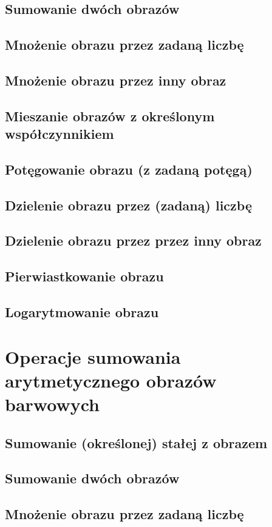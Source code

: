 \documentclass[a4paper,12pt]{book}
\begin{document}
\section{Sumowanie dwóch obrazów}
\section{Mnożenie obrazu przez zadaną liczbę}
\section{Mnożenie obrazu przez inny obraz}
\section{Mieszanie obrazów z określonym współczynnikiem}
\section{Potęgowanie obrazu (z zadaną potęgą)}
\section{Dzielenie obrazu przez (zadaną) liczbę}
\section{Dzielenie obrazu przez przez inny obraz}
\section{Pierwiastkowanie obrazu}
\section{Logarytmowanie obrazu}

\chapter{Operacje sumowania arytmetycznego obrazów barwowych}
\section{Sumowanie (określonej) stałej z obrazem}
\section{Sumowanie dwóch obrazów}
\section{Mnożenie obrazu przez zadaną liczbę}
\end{document}

